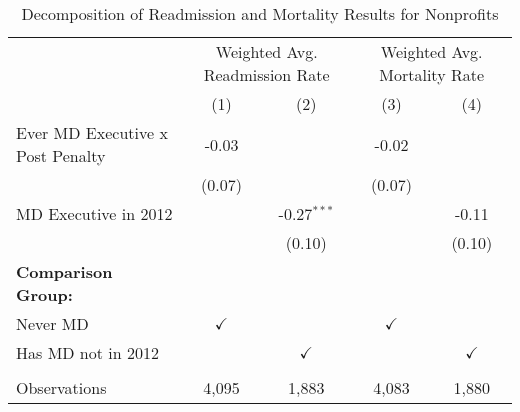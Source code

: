 \begin{table}[htbp]
   \caption{\label{tab:MD_noMD_readmort_decomp_fullsample} Decomposition of Readmission and Mortality Results for Nonprofits}
   \bigskip
   \centering
   \begin{tabular}{lcccc}
      \toprule
       & \multicolumn{2}{c}{Weighted Avg. Readmission Rate} & \multicolumn{2}{c}{Weighted Avg. Mortality Rate}\\
                                       & (1)           & (2)           & (3)           & (4)\\  
      \midrule 
      Ever MD Executive x Post Penalty & -0.03         &               & -0.02         &   \\   
                                       & (0.07)        &               & (0.07)        &   \\   
      MD Executive in 2012             &               & -0.27$^{***}$ &               & -0.11\\   
                                       &               & (0.10)        &               & (0.10)\\   
      \textbf{Comparison Group:}       &               &               &               & \\  
      Never MD                         & $\checkmark$  &               & $\checkmark$  &  \\  
      Has MD not in 2012               &               & $\checkmark$  &               & $\checkmark$\\   
       \\
      Observations                     & 4,095         & 1,883         & 4,083         & 1,880\\  
      \bottomrule
   \end{tabular}
\end{table}
